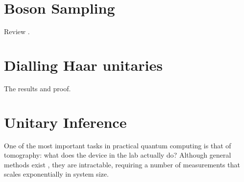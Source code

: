 \section{Boson Sampling}
\label{sec:BosenSampling}
Review \bosonsampling.

\section{Dialling Haar unitaries}
\label{sec:Parameterization}
The results and proof.

\section{Unitary Inference}
\label{sec:UnitaryInference}
One of the most important tasks in practical quantum computing is that of
tomography: what does the device in the lab actually do? Although general
methods exist , they are intractable, requiring a number
of measurements that scales exponentially in system size.
